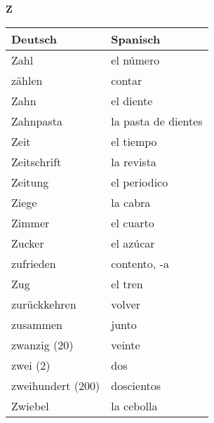 \begin{flushright}\begin{Huge}\textbf{Z}\end{Huge}\end{flushright}

\begin{longtable}{p{} p{}} 
\textbf{Deutsch}     & \textbf{Spanisch}                                       \\ \hline
\hline
\endhead %
Zahl & el número \\
zählen & contar\\
Zahn & el diente\\
Zahnpasta & la pasta de dientes\\
Zeit & el tiempo\\
Zeitschrift & la revista\\
Zeitung & el periodico \\
Ziege & la cabra\\
Zimmer & el cuarto\\
Zucker & el azúcar\\
zufrieden & contento, -a\\
Zug & el tren\\
zurückkehren & volver\\
zusammen & junto\\
zwanzig (20) & veinte\\
zwei (2) & dos\\
zweihundert (200) & doscientos\\
Zwiebel & la cebolla\\

\end{longtable}
